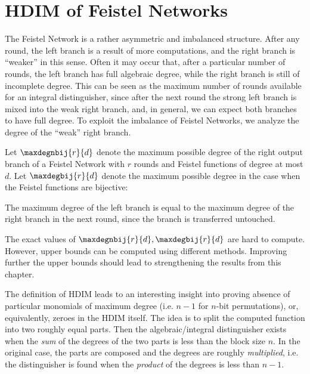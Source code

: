 \section{HDIM of Feistel Networks}

The Feistel Network is a rather asymmetric and imbalanced structure. After any round, the left branch is a result of more computations, and the right branch is ``weaker'' in this sense. Often it may occur that, after a particular number of rounds, the left branch has full algebraic degree, while the right branch is still of incomplete degree. This can be seen as the maximum number of rounds available for an integral distinguisher, since after the next round the strong left branch is mixed into the weak right branch, and, in general, we can expect both branches to have full degree. To exploit the imbalance of Feistel Networks, we analyze the degree of the ``weak'' right branch.

\begin{definition}
Let $\maxdegnbij{r}{d}$ denote the maximum possible degree of the right output branch of a Feistel Network with $r$ rounds and Feistel functions of degree at most $d$. Let $\maxdegbij{r}{d}$ denote the maximum possible degree in the case when the Feistel functions are bijective:
\end{definition}

\begin{remark}
The maximum degree of the left branch is equal to the maximum degree of the right branch in the next round, since the branch is transferred untouched.
\end{remark}

\begin{remark}
The exact values of $\maxdegnbij{r}{d},\maxdegbij{r}{d}$ are hard to compute. However, upper bounds can be computed using different methods. Improving further the upper bounds should lead to strengthening the results from this chapter.
\end{remark}

The definition of HDIM leads to an interesting insight into proving absence of particular monomials of maximum degree (i.e. $n-1$ for $n$-bit permutations), or, equivalently, zeroes in the HDIM itself. The idea is to split the computed function into two roughly equal parts. Then the algebraic/integral distinguisher exists when the \emph{sum} of the degrees of the two parts is less than the block size $n$. In the original case, the parts are composed and the degrees are roughly \emph{multiplied}, i.e. the distinguisher is found when the \emph{product} of the degrees is less than $n-1$.

